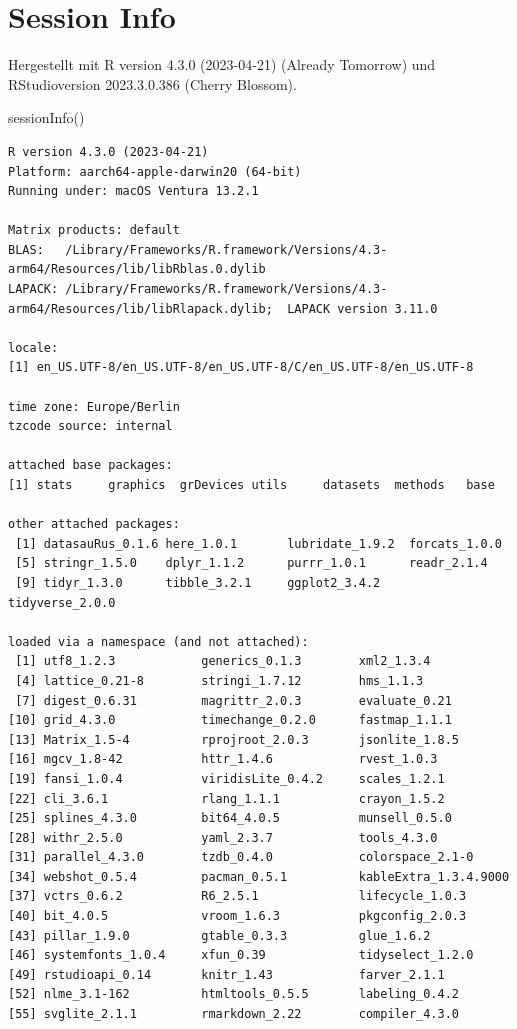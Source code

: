 \documentclass[
  letterpaper,
  DIV=11]{scrartcl}
\newenvironment{Shaded}{\begin{snugshade}}{\end{snugshade}}
\newcommand{\FunctionTok}[1]{\textcolor[rgb]{0.28,0.35,0.67}{#1}}
\newcommand{\NormalTok}[1]{\textcolor[rgb]{0.00,0.23,0.31}{#1}}
\begin{document}
\hypertarget{session-info}{%
\section*{Session Info}\label{session-info}}

Hergestellt mit R version 4.3.0 (2023-04-21) (Already Tomorrow) und
RStudioversion 2023.3.0.386 (Cherry Blossom).

\begin{Shaded}
\begin{Highlighting}[]
\FunctionTok{sessionInfo}\NormalTok{()}
\end{Highlighting}
\end{Shaded}

\begin{verbatim}
R version 4.3.0 (2023-04-21)
Platform: aarch64-apple-darwin20 (64-bit)
Running under: macOS Ventura 13.2.1

Matrix products: default
BLAS:   /Library/Frameworks/R.framework/Versions/4.3-arm64/Resources/lib/libRblas.0.dylib 
LAPACK: /Library/Frameworks/R.framework/Versions/4.3-arm64/Resources/lib/libRlapack.dylib;  LAPACK version 3.11.0

locale:
[1] en_US.UTF-8/en_US.UTF-8/en_US.UTF-8/C/en_US.UTF-8/en_US.UTF-8

time zone: Europe/Berlin
tzcode source: internal

attached base packages:
[1] stats     graphics  grDevices utils     datasets  methods   base     

other attached packages:
 [1] datasauRus_0.1.6 here_1.0.1       lubridate_1.9.2  forcats_1.0.0   
 [5] stringr_1.5.0    dplyr_1.1.2      purrr_1.0.1      readr_2.1.4     
 [9] tidyr_1.3.0      tibble_3.2.1     ggplot2_3.4.2    tidyverse_2.0.0 

loaded via a namespace (and not attached):
 [1] utf8_1.2.3            generics_0.1.3        xml2_1.3.4           
 [4] lattice_0.21-8        stringi_1.7.12        hms_1.1.3            
 [7] digest_0.6.31         magrittr_2.0.3        evaluate_0.21        
[10] grid_4.3.0            timechange_0.2.0      fastmap_1.1.1        
[13] Matrix_1.5-4          rprojroot_2.0.3       jsonlite_1.8.5       
[16] mgcv_1.8-42           httr_1.4.6            rvest_1.0.3          
[19] fansi_1.0.4           viridisLite_0.4.2     scales_1.2.1         
[22] cli_3.6.1             rlang_1.1.1           crayon_1.5.2         
[25] splines_4.3.0         bit64_4.0.5           munsell_0.5.0        
[28] withr_2.5.0           yaml_2.3.7            tools_4.3.0          
[31] parallel_4.3.0        tzdb_0.4.0            colorspace_2.1-0     
[34] webshot_0.5.4         pacman_0.5.1          kableExtra_1.3.4.9000
[37] vctrs_0.6.2           R6_2.5.1              lifecycle_1.0.3      
[40] bit_4.0.5             vroom_1.6.3           pkgconfig_2.0.3      
[43] pillar_1.9.0          gtable_0.3.3          glue_1.6.2           
[46] systemfonts_1.0.4     xfun_0.39             tidyselect_1.2.0     
[49] rstudioapi_0.14       knitr_1.43            farver_2.1.1         
[52] nlme_3.1-162          htmltools_0.5.5       labeling_0.4.2       
[55] svglite_2.1.1         rmarkdown_2.22        compiler_4.3.0       
\end{verbatim}
\end{document}
